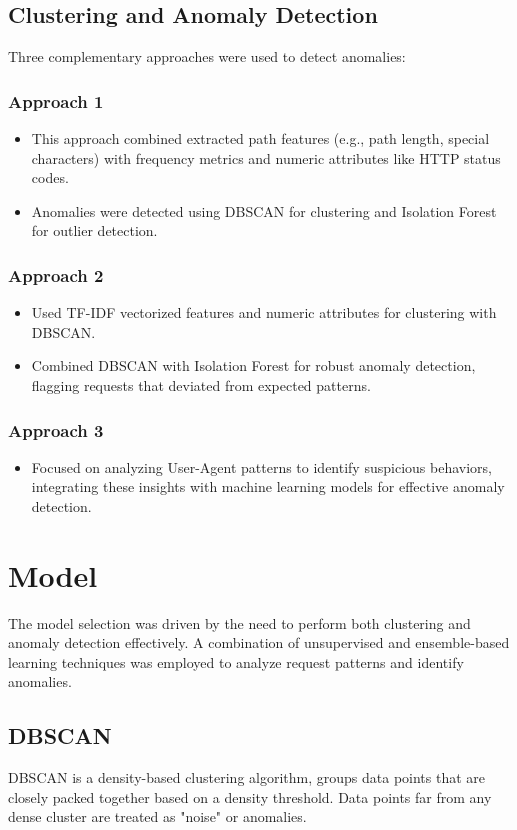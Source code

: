 \subsection{Clustering and Anomaly Detection}
Three complementary approaches were used to detect anomalies:
\subsubsection{Approach 1}
\begin{itemize}
	\item This approach combined extracted path features (e.g., path length, special characters) with frequency metrics and numeric attributes like HTTP status codes.
	\item Anomalies were detected using DBSCAN for clustering and Isolation Forest for outlier detection.
\end{itemize}
\subsubsection{Approach 2}
\begin{itemize}
	\item Used TF-IDF vectorized features and numeric attributes for clustering with DBSCAN.
	\item Combined DBSCAN with Isolation Forest for robust anomaly detection, flagging requests that deviated from expected patterns.
\end{itemize}
\subsubsection{Approach 3}
\begin{itemize}
	\item Focused on analyzing User-Agent patterns to identify suspicious behaviors, integrating these insights with machine learning models for effective anomaly detection.
\end{itemize}

\section{Model}
The model selection was driven by the need to perform both clustering and anomaly detection effectively. A combination of unsupervised and ensemble-based learning techniques was employed to analyze request patterns and identify anomalies.

\subsection{DBSCAN}
DBSCAN is a density-based clustering algorithm, groups data points that are closely packed together based on a density threshold. Data points far from any dense cluster are treated as "noise" or anomalies.


